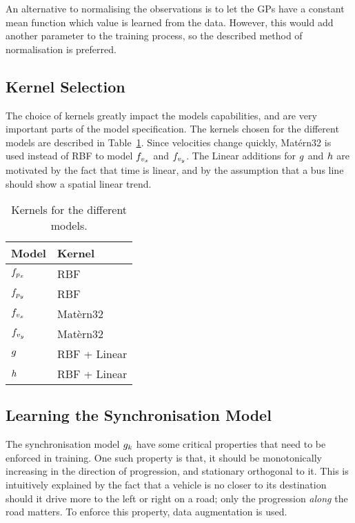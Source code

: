 An alternative to normalising the observations is to let the GPs have a constant mean function
which value is learned from the data. However, this would add another
parameter to the training process, so the described method of normalisation
is preferred.

\subsection{Kernel Selection}
The choice of kernels greatly impact the models
capabilities, and are very important parts of the model specification.
The kernels chosen for the different models are described in
Table~\ref{tbl:model-kernels}. Since velocities change
quickly, Matérn32 is used instead of RBF to model $f_{v_x}$
and $f_{v_y}$. The Linear additions for $g$ and
$h$ are motivated by the fact that time is linear, and by the
assumption that a bus line should show
a spatial linear trend.

\begin{table}[H]
  \centering
  \caption{Kernels for the different models.}\label{tbl:model-kernels}
  \begin{tabular}{| l | l |}
    \hline
    Model & Kernel \\ \hline
    $f_{p_x}$ & RBF \\ \hline
    $f_{p_y}$ & RBF  \\ \hline
    $f_{v_x}$ & Matèrn32  \\ \hline
    $f_{v_y}$ & Matèrn32 \\ \hline
    $g$     & RBF + Linear  \\ \hline
    $h$      & RBF + Linear \\
    \hline
    \end{tabular}
\end{table}



\subsection{Learning the Synchronisation Model}
The synchronisation model $g_{k}$ have some critical properties
that need to be enforced in training. One such property is that, 
it should be monotonically increasing in the direction of progression,
and stationary orthogonal to it. This is intuitively explained by the fact that a
vehicle is no closer to its destination should it drive more to the
left or right on a road; only the progression \textit{along} the road
matters. To enforce this property, data augmentation is used.

